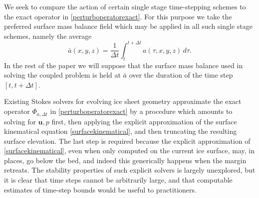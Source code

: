 \documentclass[letterpaper,final,12pt,reqno]{amsart}
\newcommand{\bu}{\mathbf{u}}
\begin{document}
We seek to compare the action of certain single stage time-stepping schemes to the exact operator in \eqref{perturboperatorexact}.  For this purpose we take the preferred surface mass balance field which may be applied in all such single stage schemes, namely the average
\begin{equation}
\bar a(x,y,z) = \frac{1}{\Delta t} \int_t^{t+\Delta t} a(\tau,x,y,z)\,d\tau.  \label{smbaverage}
\end{equation}
In the rest of the paper we will suppose that the surface mass balance used in solving the coupled problem is held at $\bar a$ over the duration of the time step $[t,t+\Delta t]$.

Existing Stokes solvers for evolving ice sheet geometry \cite{Gudmundsson1999,HelanowAhlkrona2018,Jouvetetal2008,Larouretal2012,
Lengetal2014b,Lengetal2012,LeysingerGudmundsson2004,PralongFunk2004,Seddiketal2012} %
approximate the exact operator $\Phi_{a,\Delta t}$ in \eqref{perturboperatorexact} by a procedure which amounts to solving for $\bu,p$ first, then applying the explicit approximation of the surface kinematical equation \eqref{surfacekinematical}, and then truncating the resulting surface elevation.  The last step is required because the explicit approximation of \eqref{surfacekinematical}, even when only computed on the current ice surface, may, in places, go below the bed, and indeed this generically happens when the margin retreats.  The stability properties of such explicit solvers is largely unexplored, but it is clear that time steps cannot be arbitrarily large, and that computable estimates of time-step bounds would be useful to practitioners.
\end{document}
